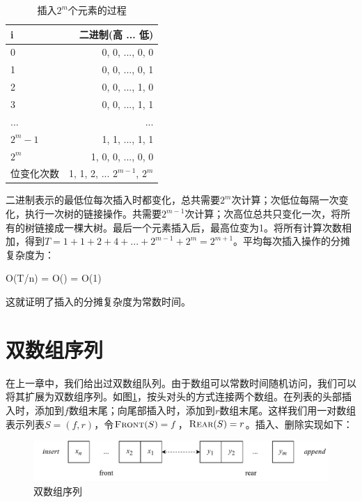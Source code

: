 \documentclass[b5paper]{ctexart}
\begin{document}
\begin{table}[htbp]
\centering
\begin{tabular}{|l|r|}
  \hline
  i & 二进制(高 ... 低) \\
  \hline
  0 & 0, 0, ..., 0, 0 \\
  1 & 0, 0, ..., 0, 1 \\
  2 & 0, 0, ..., 1, 0 \\
  3 & 0, 0, ..., 1, 1 \\
  ... & ... \\
  $2^m-1$ & 1, 1, ..., 1, 1 \\
  $2^m$ & 1, 0, 0, ..., 0, 0 \\
  \hline
  位变化次数 & 1, 1, 2, ... $2^{m-1}$, $2^m$ \\
  \hline
\end{tabular}
\caption{插入$2^m$个元素的过程}
\label{tab:ralist-insertion}
\end{table}

二进制表示的最低位每次插入时都变化，总共需要$2^m$次计算；次低位每隔一次变化，执行一次树的链接操作。共需要$2^{m-1}$次计算；次高位总共只变化一次，将所有的树链接成一棵大树。最后一个元素插入后，最高位变为1。将所有计算次数相加，得到$T = 1 + 1 + 2 + 4 + ... + 2^{m-1} + 2^m = 2^{m+1}$。平均每次插入操作的分摊复杂度为：

\be
O(T/n) = O() = O(1)
\ee

这就证明了插入的分摊复杂度为常数时间。

\begin{Exercise}
\end{Exercise}

\section{双数组序列}
 

在上一章中，我们给出过双数组队列。由于数组可以常数时间随机访问，我们可以将其扩展为双数组序列。如图\ref{fig:parrays}，按头对头的方式连接两个数组。在列表的头部插入时，添加到$f$数组末尾；向尾部插入时，添加到$r$数组末尾。这样我们用一对数组表示列表$S = (f, r)$，令$\textproc{Front}(S) = f$，$\textproc{Rear}(S) = r$。插入、删除实现如下：

\begin{figure}[htbp]
  \centering
  \includegraphics[scale=0.7]{img/parrays}
  \caption{双数组序列}
  \label{fig:parrays}
\end{figure}
\end{document}
